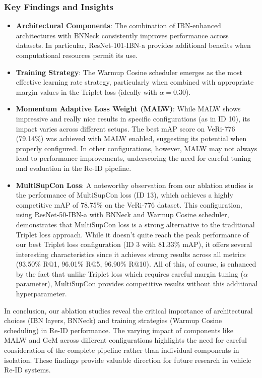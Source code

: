 \subsubsection{Key Findings and Insights}
\begin{itemize}
    \item \textbf{Architectural Components}: The combination of IBN-enhanced architectures with BNNeck consistently improves performance across datasets. In particular, ResNet-101-IBN-a provides additional benefits when computational resources permit its use.
    
    \item \textbf{Training Strategy}: The Warmup Cosine scheduler emerges as the most effective learning rate strategy, particularly when combined with appropriate margin values in the Triplet loss (ideally with $\alpha = 0.30$).
    
    \item \textbf{Momentum Adaptive Loss Weight (MALW)}: While MALW shows impressive and really nice results in specific configurations (as in ID 10), its impact varies across different setups. The best mAP score on VeRi-776 (79.14\%) was achieved with MALW enabled, suggesting its potential when properly configured. In other configurations, however, MALW may not always lead to performance improvements, underscoring the need for careful tuning and evaluation in the Re-ID pipeline.
    
    \item \textbf{MultiSupCon Loss}:
    A noteworthy observation from our ablation studies is the performance of MultiSupCon loss (ID 13), which achieves a highly competitive mAP of 78.75\% on the VeRi-776 dataset. This configuration, using ResNet-50-IBN-a with BNNeck and Warmup Cosine scheduler, demonstrates that MultiSupCon loss is a strong alternative to the traditional Triplet loss approach. While it doesn't quite reach the peak performance of our best Triplet loss configuration (ID 3 with 81.33\% mAP), it offers several interesting characteristics since it achieves strong results across all metrics (93.50\% R@1, 96.01\% R@5, 96.90\% R@10). All of this, of course, is enhanced by the fact that unlike Triplet loss which requires careful margin tuning ($\alpha$ parameter), MultiSupCon provides competitive results without this additional hyperparameter.
\end{itemize}

In conclusion, our ablation studies reveal the critical importance of architectural choices (IBN layers, BNNeck) and training strategies (Warmup Cosine scheduling) in Re-ID performance. The varying impact of components like MALW and GeM across different configurations highlights the need for careful consideration of the complete pipeline rather than individual components in isolation. These findings provide valuable direction for future research in vehicle Re-ID systems.

